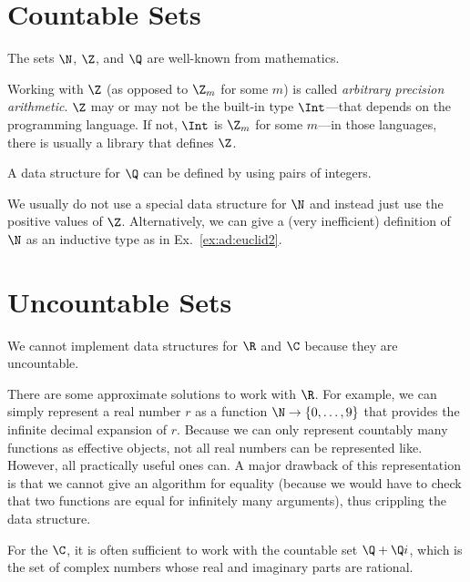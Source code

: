 \section{Countable Sets}

The sets $\N$, $\Z$, and $\Q$ are well-known from mathematics.

Working with $\Z$ (as opposed to $\Z_m$ for some $m$) is called \emph{arbitrary precision arithmetic}.
$\Z$ may or may not be the built-in type $\Int$---that depends on the programming language.
If not, $\Int$ is $\Z_m$ for some $m$---in those languages, there is usually a library that defines $\Z$.

A data structure for $\Q$ can be defined by using pairs of integers.

We usually do not use a special data structure for $\N$ and instead just use the positive values of $\Z$.
Alternatively, we can give a (very inefficient) definition of $\N$ as an inductive type as in Ex.~\ref{ex:ad:euclid2}.

\section{Uncountable Sets}

We cannot implement data structures for $\R$ and $\C$ because they are uncountable.

There are some approximate solutions to work with $\R$.
For example, we can simply represent a real number $r$ as a function $\N\to\{0,\ldots,9\}$ that provides the infinite decimal expansion of $r$.
Because we can only represent countably many functions as effective objects, not all real numbers can be represented like.
However, all practically useful ones can.
A major drawback of this representation is that we cannot give an algorithm for equality (because we would have to check that two functions are equal for infinitely many arguments), thus crippling the data structure.

For the $\C$, it is often sufficient to work with the countable set $\Q+\Q i$, which is the set of complex numbers whose real and imaginary parts are rational.